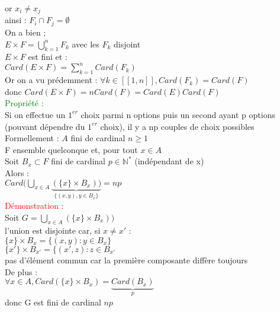 \documentclass{article}
\begin{document}
or $x_i\neq x_j $ \\
ainsi : $F_i \cap F_j = \emptyset $ \\
On a bien ; \\
$E \times F= \bigcup_{k=1}^n F_k$  avec les $F_k$ disjoint \\
$E \times F$ est fini et : \\
$Card(E\times F)= \sum_{k=1}^n Card(F_k)$ \\
Or on a vu prédemment : $\forall k \in [[1,n]], Card(F_k)=Card(F)$ \\
donc $Card(E \times F) = n Card(F)=Card(E) Card(F)$ \\
\textcolor{green}{Propriété :} \\
Si on effectue un $1^{er}$ choix parmi n options puis un second ayant p options (pouvant dépendre du $1^{er}$ choix), il y a np couples de choix possibles \\
Formellement : $A$ fini de cardinal $n \geq 1$ \\
F ensemble quelconque et, pour tout $x \in A$ \\
Soit $B_x \subset F$ fini de cardinal $p \in \mathbb N^*$ (indépendant de x) \\
Alors : \\
$Card ( \bigcup_{x \in A}\underbrace{(\lbrace x \rbrace \times B_x))}_{\lbrace (x,y),y\in B_x \rbrace}=np$ \\
\textcolor{red}{Démonstration :} \\
Soit $G= \bigcup_{x \in A} {(\lbrace x \rbrace \times B_x))}$ \\
l'union est disjointe car, si $x \neq x'$ : \\
$\lbrace x \rbrace \times B_x = \lbrace (x,y) : y\in B_x \rbrace $ \\
$ \lbrace x' \rbrace \times B_{x'}=\lbrace (x',z) : z \in B_{x'}$ \\
pas d'élément commun car la première composante diffère toujours \\
De plus : \\
$\forall x \in A, Card(\lbrace x \rbrace \times B_x)= \underbrace{Card(B_x)}_{p}$ \\
donc G est fini de cardinal $np$
\end{document}
